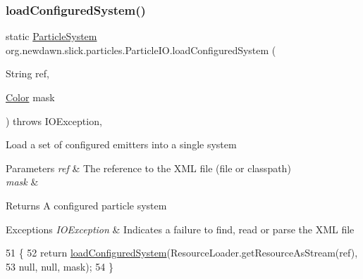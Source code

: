 \subsubsection{\texorpdfstring{load\+Configured\+System()}{loadConfiguredSystem()}\hspace{0.1cm}{\footnotesize\ttfamily [1/9]}}
{\footnotesize\ttfamily static \mbox{\hyperlink{classorg_1_1newdawn_1_1slick_1_1particles_1_1_particle_system}{Particle\+System}} org.\+newdawn.\+slick.\+particles.\+Particle\+I\+O.\+load\+Configured\+System (\begin{DoxyParamCaption}\item[{String}]{ref,  }\item[{\mbox{\hyperlink{classorg_1_1newdawn_1_1slick_1_1_color}{Color}}}]{mask }\end{DoxyParamCaption}) throws I\+O\+Exception\hspace{0.3cm}{\ttfamily [inline]}, {\ttfamily [static]}}

Load a set of configured emitters into a single system


\begin{DoxyParams}{Parameters}
{\em ref} & The reference to the X\+ML file (file or classpath) \\
\hline
{\em mask} & \\
\hline
\end{DoxyParams}
\begin{DoxyReturn}{Returns}
A configured particle system 
\end{DoxyReturn}

\begin{DoxyExceptions}{Exceptions}
{\em I\+O\+Exception} & Indicates a failure to find, read or parse the X\+ML file \\
\hline
\end{DoxyExceptions}

\begin{DoxyCode}
51                                \{
52         \textcolor{keywordflow}{return} \mbox{\hyperlink{classorg_1_1newdawn_1_1slick_1_1particles_1_1_particle_i_o_a1da2bcc8784c9cf967326954bc3c9d33}{loadConfiguredSystem}}(ResourceLoader.getResourceAsStream(ref),
53             null, null, mask);
54     \}
\end{DoxyCode}
\mbox{\label{classorg_1_1newdawn_1_1slick_1_1particles_1_1_particle_i_o_adc1ef023e9e2c247cfd88b80ff84fabc}} 
